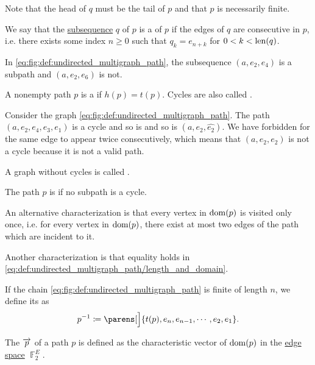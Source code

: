 \begin{definition}
\begin{thmenum}
    Note that the head of \( q \) must be the tail of \( p \) and that \( p \) is necessarily finite.

     We say that the \hyperref[def:sequence]{subsequence} \( q \) of \( p \) is a  of \( p \) if the edges of \( q \) are consecutive in \( p \), i.e. there exists some index \( n \geq 0 \) such that \( q_k = e_{n + k} \) for \( 0 < k < \operatorname{len}(q) \).

    In \eqref{eq:fig:def:undirected_multigraph_path}, the subsequence \( (a, e_2, e_4) \) is a subpath and \( (a, e_2, e_6) \) is not.

     A nonempty path \( p \) is a  if \( h(p) = t(p) \). Cycles are also called .

    Consider the graph \eqref{eq:fig:def:undirected_multigraph_path}. The path \( (a, e_2, e_4, e_3, e_1) \) is a cycle and so is and so is \( (a, e_2, \widehat{e_2}) \). We have forbidden for the same edge to appear twice consecutively, which means that \( (a, e_2, e_2) \) is not a cycle because it is not a valid path.

    A graph without cycles is called .

     The path \( p \) is  if no subpath is a cycle.

    An alternative characterization is that every vertex in \( \operatorname{dom}(p) \) is visited only once, i.e. for every vertex in \( \operatorname{dom}(p) \), there exist at most two edges of the path which are incident to it.

    Another characterization is that equality holds in \eqref{eq:def:undirected_multigraph_path/length_and_domain}.

     If the chain \eqref{eq:fig:def:undirected_multigraph_path} is finite of length \( n \), we define its  as
    \begin{equation*}
      p^{-1} \coloneqq \parens[\Big]{ t(p), e_n, e_{n-1}, \cdots, e_2, e_1 }.
    \end{equation*}

     The  \( \overrightarrow{p} \) of a path \( p \) is defined as the characteristic vector of \( \operatorname{dom}(p) \) in the \hyperref[def:hypergraph_vector_spaces/edge]{edge space} \( \BbbF_2^E \).
  \end{thmenum}
\end{definition}

